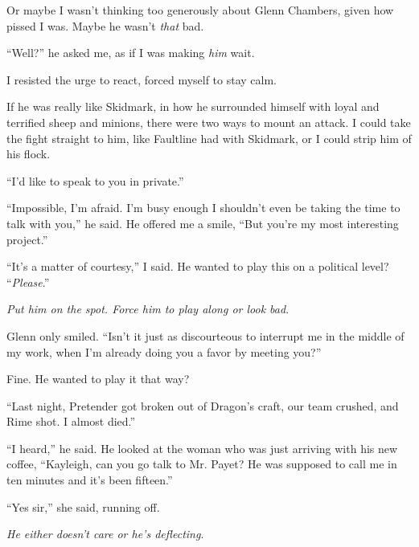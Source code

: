 Or maybe I wasn't thinking too generously about Glenn Chambers, given how pissed I was.  Maybe he wasn't \emph{that} bad.



``Well?'' he asked me, as if I was making \emph{him} wait.



I resisted the urge to react, forced myself to stay calm.



If he was really like Skidmark, in how he surrounded himself with loyal and terrified sheep and minions, there were two ways to mount an attack.  I could take the fight straight to him, like Faultline had with Skidmark, or I could strip him of his flock.



``I'd like to speak to you in private.''



``Impossible, I'm afraid.  I'm busy enough I shouldn't even be taking the time to talk with you,'' he said.  He offered me a smile, ``But you're my most interesting project.''



``It's a matter of courtesy,'' I said.  He wanted to play this on a political level?  ``\emph{Please}.''



\emph{Put him on the spot.  Force him to play along or look bad}.



Glenn only smiled.  ``Isn't it just as discourteous to interrupt me in the middle of my work, when I'm already doing you a favor by meeting you?''



Fine.  He wanted to play it that way?



``Last night, Pretender got broken out of Dragon's craft, our team crushed, and Rime shot.  I almost died.''



``I heard,'' he said.  He looked at the woman who was just arriving with his new coffee, ``Kayleigh, can you go talk to Mr. Payet?  He was supposed to call me in ten minutes and it's been fifteen.''



``Yes sir,'' she said, running off.



\emph{He either doesn't care or he's deflecting}.



